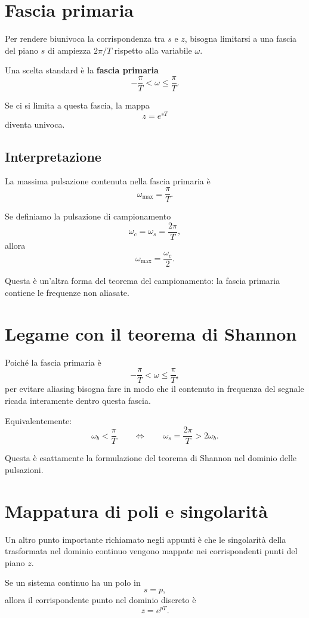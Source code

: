 \section{Fascia primaria}

Per rendere biunivoca la corrispondenza tra \(s\) e \(z\), bisogna limitarsi a una fascia
del piano \(s\) di ampiezza \(2\pi/T\) rispetto alla variabile \(\omega\).

Una scelta standard è la \textbf{fascia primaria}
\[
-\frac{\pi}{T}<\omega\le \frac{\pi}{T}.
\]

Se ci si limita a questa fascia, la mappa
\[
z=e^{sT}
\]
diventa univoca.

\subsection{Interpretazione}

La massima pulsazione contenuta nella fascia primaria è
\[
\omega_{\max}=\frac{\pi}{T}.
\]

Se definiamo la pulsazione di campionamento
\[
\omega_c=\omega_s=\frac{2\pi}{T},
\]
allora
\[
\omega_{\max}=\frac{\omega_c}{2}.
\]

Questa è un'altra forma del teorema del campionamento:
la fascia primaria contiene le frequenze non aliasate.

\section{Legame con il teorema di Shannon}

Poiché la fascia primaria è
\[
-\frac{\pi}{T}<\omega\le \frac{\pi}{T},
\]
per evitare aliasing bisogna fare in modo che il contenuto in frequenza del segnale
ricada interamente dentro questa fascia.

Equivalentemente:
\[
\omega_b < \frac{\pi}{T}
\qquad \Longleftrightarrow \qquad
\omega_s=\frac{2\pi}{T}>2\omega_b.
\]

Questa è esattamente la formulazione del teorema di Shannon nel dominio delle pulsazioni.

\section{Mappatura di poli e singolarità}

Un altro punto importante richiamato negli appunti è che le singolarità della trasformata
nel dominio continuo vengono mappate nei corrispondenti punti del piano \(z\).

Se un sistema continuo ha un polo in
\[
s=p,
\]
allora il corrispondente punto nel dominio discreto è
\[
z=e^{pT}.
\]

